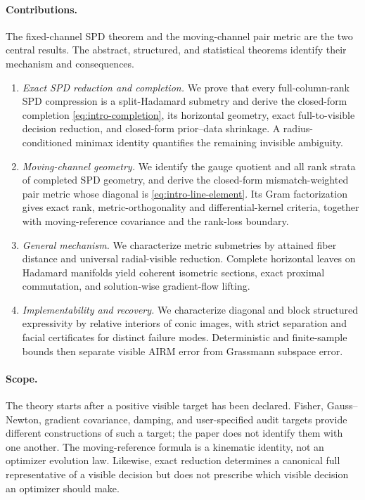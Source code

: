 \paragraph{Contributions.}
The fixed-channel SPD theorem and the moving-channel pair metric are the two
central results.  The abstract, structured, and statistical theorems identify
their mechanism and consequences.
\begin{enumerate}[leftmargin=*,itemsep=2pt]
  \item \emph{Exact SPD reduction and completion.}  We prove that every
  full-column-rank SPD compression is a
  split-Hadamard submetry and derive the closed-form completion
  \eqref{eq:intro-completion}, its horizontal geometry, exact full-to-visible
  decision reduction, and closed-form prior--data shrinkage.  A
  radius-conditioned minimax identity quantifies the remaining invisible
  ambiguity.
  \item \emph{Moving-channel geometry.}  We identify the gauge quotient and
  all rank strata of completed SPD geometry, and derive the closed-form
  mismatch-weighted pair metric whose diagonal is
  \eqref{eq:intro-line-element}.  Its Gram factorization gives exact rank,
  metric-orthogonality and differential-kernel criteria, together with
  moving-reference covariance and the rank-loss boundary.
  \item \emph{General mechanism.}  We characterize metric submetries by
  attained fiber distance and universal radial-visible reduction.  Complete
  horizontal leaves on Hadamard manifolds yield coherent isometric sections,
  exact proximal commutation, and solution-wise gradient-flow lifting.
  \item \emph{Implementability and recovery.}  We characterize diagonal and
  block structured expressivity by
  relative interiors of conic images, with strict separation and facial
  certificates for distinct failure modes.  Deterministic and finite-sample
  bounds then separate visible AIRM error from Grassmann subspace error.
\end{enumerate}

\paragraph{Scope.}
The theory starts after a positive visible target has been declared.  Fisher,
Gauss--Newton, gradient covariance, damping, and user-specified audit targets
provide different constructions of such a target; the paper does not identify
them with one another.  The moving-reference formula is a kinematic identity,
not an optimizer evolution law.  Likewise, exact reduction determines a
canonical full representative of a visible decision but does not prescribe
which visible decision an optimizer should make.

